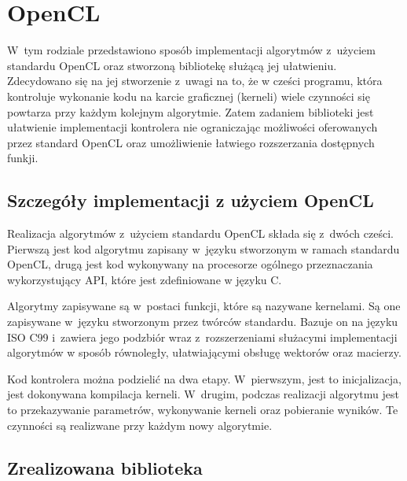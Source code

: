 \chapter{OpenCL}
\label{cha:opencl}

W~tym rodziale przedstawiono sposób implementacji algorytmów z~użyciem standardu OpenCL oraz stworzoną bibliotekę służącą jej ułatwieniu. Zdecydowano się na jej stworzenie z~uwagi na to, że w cześci programu, która kontroluje wykonanie kodu na karcie graficznej (kerneli) wiele czynności się powtarza przy każdym kolejnym algorytmie. Zatem zadaniem biblioteki jest ułatwienie implementacji kontrolera nie ograniczając możliwości oferowanych przez standard OpenCL oraz umożliwienie łatwiego rozszerzania dostępnych funkji.

\section{Szczegóły implementacji z użyciem OpenCL}  
\label{sec:szczegolyOpenCL}

Realizacja algorytmów z~użyciem standardu OpenCL składa się z~dwóch cześci. Pierwszą jest kod algorytmu zapisany w~języku stworzonym w ramach standardu OpenCL, drugą jest kod wykonywany na procesorze ogólnego przeznaczania wykorzystujący API, które jest zdefiniowane w języku C.

Algorytmy zapisywane są w~postaci funkcji, które są nazywane kernelami. Są one zapisywane w~języku stworzonym przez twórców standardu. Bazuje on na języku ISO C99 i~zawiera jego podzbiór wraz z~rozszerzeniami służacymi implementacji algorytmów w sposób równoległy, ułatwiającymi obsługę wektorów oraz macierzy. 

Kod kontrolera można podzielić na dwa etapy. W~pierwszym, jest to inicjalizacja, jest dokonywana kompilacja kerneli. W~drugim, podczas realizacji algorytmu jest to przekazywanie parametrów, wykonywanie kerneli oraz pobieranie wyników. Te czynności są realizwane przy każdym nowy algorytmie.

\section{Zrealizowana biblioteka}  
\label{sec:biblioteka}

